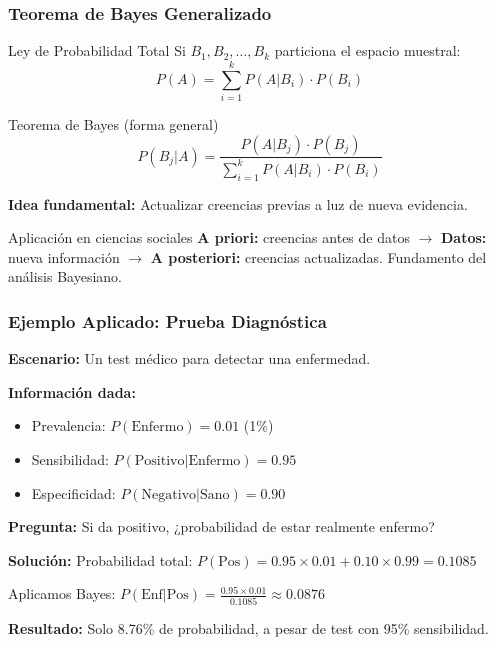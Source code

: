 \documentclass[aspectratio=169,11pt]{beamer}
\begin{document}
\begin{frame}[fragile]
\frametitle{Teorema de Bayes Generalizado}

\small

\begin{block}{Ley de Probabilidad Total}
Si $B_1, B_2, \ldots, B_k$ particiona el espacio muestral:
$$P(A) = \sum_{i=1}^{k} P(A|B_i) \cdot P(B_i)$$
\end{block}

\pause
\vspace{-0.1cm}
\begin{block}{Teorema de Bayes (forma general)}
$$P(B_j|A) = \frac{P(A|B_j) \cdot P(B_j)}{\sum_{i=1}^{k} P(A|B_i) \cdot P(B_i)}$$
\end{block}

\pause
\vspace{0.05cm}
\textbf{Idea fundamental:} Actualizar creencias previas a luz de nueva evidencia.

\pause
\vspace{-0.05cm}
\begin{exampleblock}{Aplicación en ciencias sociales}
\textbf{A priori:} creencias antes de datos $\to$ \textbf{Datos:} nueva información $\to$ \textbf{A posteriori:} creencias actualizadas. Fundamento del análisis Bayesiano.
\end{exampleblock}
\end{frame}

\begin{frame}[fragile]
\frametitle{Ejemplo Aplicado: Prueba Diagnóstica}

\small

\textbf{Escenario:} Un test médico para detectar una enfermedad.

\pause
\textbf{Información dada:}
\begin{itemize}\setlength{\itemsep}{0pt}
  \item Prevalencia: $P(\text{Enfermo}) = 0.01$ (1\%)
  \item Sensibilidad: $P(\text{Positivo}|\text{Enfermo}) = 0.95$
  \item Especificidad: $P(\text{Negativo}|\text{Sano}) = 0.90$
\end{itemize}

\pause
\textbf{Pregunta:} Si da positivo, ¿probabilidad de estar realmente enfermo?

\pause
\textbf{Solución:} Probabilidad total:
$P(\text{Pos}) = 0.95 \times 0.01 + 0.10 \times 0.99 = 0.1085$

\pause
Aplicamos Bayes:
$P(\text{Enf}|\text{Pos}) = \frac{0.95 \times 0.01}{0.1085} \approx 0.0876$

\vspace{0.1cm}
\textbf{Resultado:} Solo 8.76\% de probabilidad, a pesar de test con 95\% sensibilidad.
\end{frame}
\end{document}
